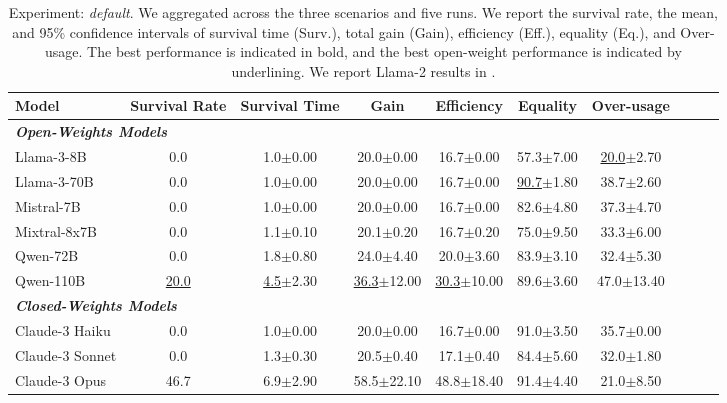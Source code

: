 \documentclass{article}
\begin{document}
\begin{table}[t]
\centering \small

\caption{Experiment: \textit{default}. We aggregated across the three scenarios and five runs. We report the survival rate, the mean, and 95\% confidence intervals of survival time (Surv.), total gain (Gain), efficiency (Eff.), equality (Eq.), and Over-usage. The best performance is indicated in bold, and the best open-weight performance is indicated by underlining. We report Llama-2 results in .
}
\label{tab:experiment_default}
\begin{tabular}{lccccccccc}
\toprule
%
Model & Survival Rate & Survival Time & Gain & Efficiency & Equality & Over-usage \\
\midrule
\multicolumn{2}{l}{\textbf{\textit{Open-Weights Models}}}  \\
%
%
%
Llama-3-8B & 0.0 & 1.0\tiny{$\pm$0.00} & 20.0\tiny{$\pm$0.00} & 16.7\tiny{$\pm$0.00} & 57.3\tiny{$\pm$7.00} & \underline{20.0}\tiny{$\pm$2.70} \\
Llama-3-70B & 0.0 & 1.0\tiny{$\pm$0.00} & 20.0\tiny{$\pm$0.00} & 16.7\tiny{$\pm$0.00} & \underline{90.7}\tiny{$\pm$1.80} & 38.7\tiny{$\pm$2.60} \\
Mistral-7B & 0.0 & 1.0\tiny{$\pm$0.00} & 20.0\tiny{$\pm$0.00} & 16.7\tiny{$\pm$0.00} & 82.6\tiny{$\pm$4.80} & 37.3\tiny{$\pm$4.70} \\
Mixtral-8x7B & 0.0 & 1.1\tiny{$\pm$0.10} & 20.1\tiny{$\pm$0.20} & 16.7\tiny{$\pm$0.20} & 75.0\tiny{$\pm$9.50} & 33.3\tiny{$\pm$6.00} \\
Qwen-72B & 0.0 & 1.8\tiny{$\pm$0.80} & 24.0\tiny{$\pm$4.40} & 20.0\tiny{$\pm$3.60} & 83.9\tiny{$\pm$3.10} & 32.4\tiny{$\pm$5.30} \\
Qwen-110B & \underline{20.0} & \underline{4.5}\tiny{$\pm$2.30} & \underline{36.3}\tiny{$\pm$12.00} & \underline{30.3}\tiny{$\pm$10.00} & 89.6\tiny{$\pm$3.60} & 47.0\tiny{$\pm$13.40} \\
\midrule
\multicolumn{2}{l}{\textbf{\textit{Closed-Weights Models}}}  \\
Claude-3 Haiku & 0.0 & 1.0\tiny{$\pm$0.00} & 20.0\tiny{$\pm$0.00} & 16.7\tiny{$\pm$0.00} & 91.0\tiny{$\pm$3.50} & 35.7\tiny{$\pm$0.00} \\
Claude-3 Sonnet & 0.0 & 1.3\tiny{$\pm$0.30} & 20.5\tiny{$\pm$0.40} & 17.1\tiny{$\pm$0.40} & 84.4\tiny{$\pm$5.60} & 32.0\tiny{$\pm$1.80} \\
Claude-3 Opus & 46.7 & 6.9\tiny{$\pm$2.90} & 58.5\tiny{$\pm$22.10} & 48.8\tiny{$\pm$18.40} & 91.4\tiny{$\pm$4.40} & 21.0\tiny{$\pm$8.50} \\

\end{tabular}
\end{table}
\end{document}
